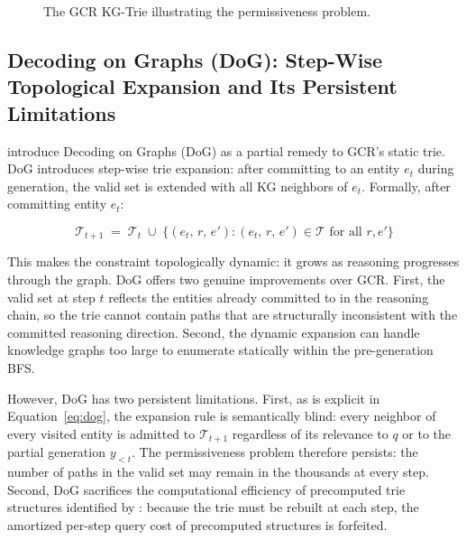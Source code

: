 \begin{figure}[H]
{
    }
    \caption{The GCR KG-Trie illustrating the permissiveness problem.}
    \label{fig:gcrtrie}
\end{figure}

\subsection{Decoding on Graphs (DoG): Step-Wise Topological Expansion and Its
    Persistent Limitations}

\citet{li2024dog} introduce Decoding on Graphs (DoG) as a partial remedy to
GCR's static trie. DoG introduces step-wise trie expansion: after committing to
an entity $e_t$ during generation, the valid set is extended with all KG
neighbors of $e_t$. Formally, after committing entity $e_t$:

\begin{equation}
    \mathcal{T}_{t+1} \;=\; \mathcal{T}_t \;\cup\; \bigl\{(e_t,\, r,\, e') :
    (e_t,\, r,\, e') \in \mathcal{T}\text{ for all } r, e'\bigr\}
    \label{eq:dog}
\end{equation}

This makes the constraint topologically dynamic: it grows as reasoning
progresses through the graph. DoG offers two genuine improvements over GCR.
First, the valid set at step $t$ reflects the entities already committed to in
the reasoning chain, so the trie cannot contain paths that are structurally
inconsistent with the committed reasoning direction. Second, the dynamic
expansion can handle knowledge graphs too large to enumerate statically within
the pre-generation BFS.

However, DoG has two persistent limitations. First, as is explicit in
Equation~\eqref{eq:dog}, the expansion rule is semantically blind: every
neighbor of every visited entity is admitted to $\mathcal{T}_{t+1}$ regardless
of its relevance to $q$ or to the partial generation $y_{<t}$. The permissiveness
problem therefore persists: the number of paths in the valid set may remain in
the thousands at every step. Second, DoG sacrifices the computational efficiency
of precomputed trie structures identified by \citet{willard2023outlines}: because
the trie must be rebuilt at each step, the amortized per-step query cost of
precomputed structures is forfeited.

